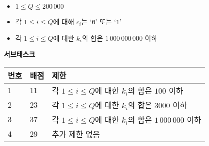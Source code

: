 \begin{itemize}
\item $1 \le Q \le 200\,000$
\item 각 $1 \le i \le Q$에 대해 $c_i$는 `\texttt{0}' 또는 `\texttt{1}' 
\item 각 $1 \le i \le Q$에 대한 $k_i$의 합은 $1\,000\,000\,000$ 이하
\end{itemize}

\textbf{서브태스크}

\begin{tabular}{|l|l|l|} \hline
  \textbf{번호} & \textbf{배점} & \textbf{제한} \\ \hline
  1 & 11 & 각 $1 \le i \le Q$에 대한 $k_i$의 합은 $100$ 이하 \\ \hline
  2 & 23 & 각 $1 \le i \le Q$에 대한 $k_i$의 합은 $3000$ 이하 \\ \hline
  3 & 37 & 각 $1 \le i \le Q$에 대한 $k_i$의 합은 $1\,000\,000$ 이하 \\ \hline
  4 & 29 & 추가 제한 없음 \\ \hline
\end{tabular}